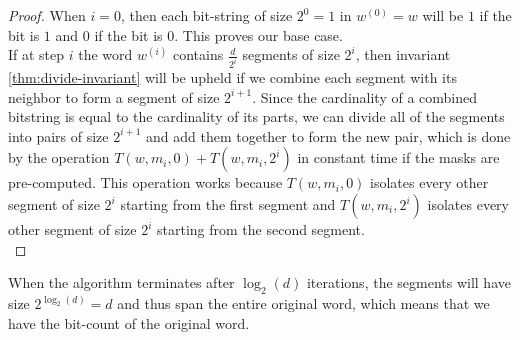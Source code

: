 \begin{proof}
    When $i=0$, then each bit-string of size $2^0=1$ in $w^{(0)} = w$ will be $1$ if the bit is $1$ and $0$ if the bit is $0$. This proves our base case. \\
    If at step $i$ the word $w^{(i)}$ contains $\frac{d}{2^i}$ segments of size $2^i$, then invariant \ref{thm:divide-invariant} will be upheld if we combine each segment with its neighbor to form a segment of size $2^{i+1}$. Since the cardinality of a combined bitstring is equal to the cardinality of its parts, we can divide all of the segments into pairs of size $2^{i+1}$ and add them together to form the new pair, which is done by the operation $T(w, m_i, 0) + T(w, m_i, 2^i)$ in constant time if the masks are pre-computed. This operation works because $T(w, m_i, 0)$ isolates every other segment of size $2^i$ starting from the first segment and $T(w, m_i, 2^i)$ isolates every other segment of size $2^i$ starting from the second segment.\\
\end{proof}
When the algorithm terminates after $\log_2(d)$ iterations, the segments will have size $2^{\log_2{(d)}} = d$ and thus span the entire original word, which means that we have the bit-count of the original word. %

